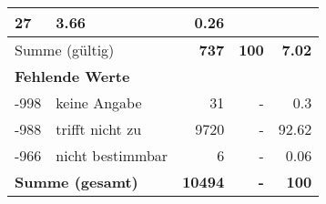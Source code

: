 \begin{longtable}{lXrrr}
       \num{27} &
       \num[round-mode=places,round-precision=2]{3,66} &
         \num[round-mode=places,round-precision=2]{0,26} \\
     \midrule
     \multicolumn{2}{l}{Summe (gültig)} &
       \textbf{\num{737}} &
     \textbf{100} &
       \textbf{\num[round-mode=places,round-precision=2]{7,02}} \\
     \multicolumn{5}{l}{\textbf{Fehlende Werte}}\\
       -998 &
       keine Angabe &
         \num{31} &
        - &
         \num[round-mode=places,round-precision=2]{0,3} \\
       -988 &
       trifft nicht zu &
         \num{9720} &
        - &
         \num[round-mode=places,round-precision=2]{92,62} \\
       -966 &
       nicht bestimmbar &
         \num{6} &
        - &
         \num[round-mode=places,round-precision=2]{0,06} \\
     \midrule
     \multicolumn{2}{l}{\textbf{Summe (gesamt)}} &
          \textbf{\num{10494}} &
        \textbf{-} &
        \textbf{100} \\
     \bottomrule
     \end{longtable}
     
